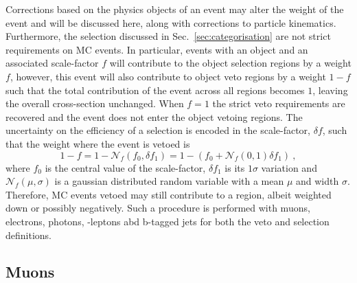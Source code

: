 Corrections based on the physics objects of an event may alter the weight of
the event and will be discussed here, along with corrections to particle
kinematics. Furthermore, the selection discussed in
Sec.~\ref{sec:categorisation} are not strict requirements on MC events. In
particular, events with an object and an associated scale-factor $f$ will
contribute to the object selection regions by a weight $f$, however, this
event will also contribute to object veto regions by a weight $1-f$ such that
the total contribution of the event across all regions becomes $1$, leaving
the overall cross-section unchanged. When $f=1$ the strict veto requirements
are recovered and the event does not enter the object vetoing regions. The
uncertainty on the efficiency of a selection is encoded in the scale-factor,
$\delta f$, such that the weight where the event is vetoed is
%
\begin{equation}
    1 - f = 1 - \mathcal{N}_f(f_0,\delta f_1) = 1 - (f_0 + \mathcal{N}_f(0,1)\delta f_1)\ ,
\end{equation}
%
where $f_0$ is the central value of the scale-factor, $\delta f_1$ is its
$1\sigma$ variation and $\mathcal{N}_f(\mu,\sigma)$ is a gaussian distributed
random variable with a mean $\mu$ and width $\sigma$. Therefore, MC events
vetoed may still contribute to a region, albeit weighted down or possibly
negatively. Such a procedure is performed with muons, electrons, photons,
\Ptauh-leptons abd b-tagged jets for both the veto and selection definitions.


\subsection{Muons}

